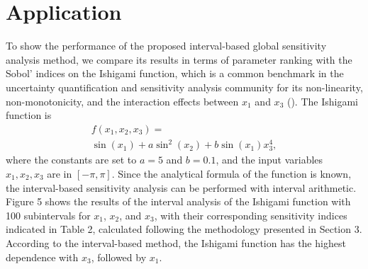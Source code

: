 \documentclass[twocolumn]{rps-esrel2022}
\begin{document}

\section{Application}

To show the performance of the proposed interval-based global sensitivity analysis method, we compare
its results in terms of parameter ranking with the Sobol' indices on the Ishigami function, which is a common benchmark in the uncertainty quantification and sensitivity analysis community for its non-linearity, non-monotonicity, and the interaction effects between $x_1$ and $x_3$ (\cite{ishigami1990importance}). The Ishigami function is
%
    \begin{multline}
	f(x_1,x_2,x_3) =  \\  \sin(x_1) + a\sin^2(x_2) + b\sin(x_1)x_3^4{,}
	\end{multline}
%
\noindent where the constants are set to $a=5$ and $b=0.1$, and the input variables $x_1,x_2,x_3$ are in $[-\pi,\pi]$.
%
Since the analytical formula of the function is known, the interval-based sensitivity analysis can be performed with interval
arithmetic.
Figure 5 shows the results of the interval analysis of the Ishigami function with 100 subintervals for $x_1$, $x_2$, and $x_3$, with their corresponding sensitivity
indices indicated in Table 2, calculated following the methodology presented in Section 3.
According to the interval-based method, the Ishigami function has the highest dependence with $x_3$, followed by $x_1$.
\end{document}

